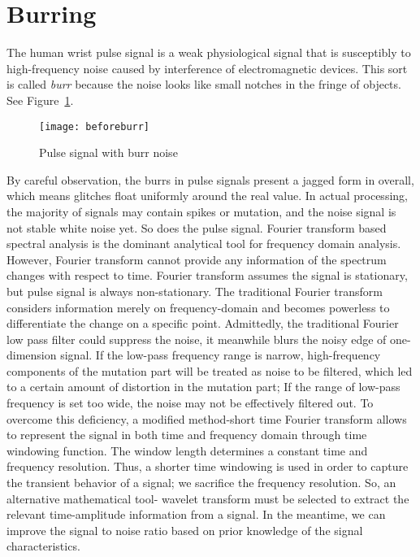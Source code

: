 \section{Burring}
The human wrist pulse signal is a weak physiological signal that
is susceptibly to high-frequency noise caused by interference of
electromagnetic devices. This sort is called \emph{burr} because the
noise looks like small notches in the fringe of objects. See
Figure~\ref{fig:beforeburr}. 
\begin{figure}[htpb]
    \begin{center}
        \texttt{[image: beforeburr]}
    \end{center}
    \caption{Pulse signal with burr noise}
    \label{fig:beforeburr}
\end{figure}
By careful observation, the burrs in pulse signals present a jagged
form in overall, which means glitches float uniformly around the real
value. In actual processing, the majority of signals may contain
spikes or mutation, and the noise signal is not stable white noise yet. 
So does the pulse signal. Fourier transform based spectral analysis is
the dominant analytical tool for frequency 
domain analysis. However, Fourier transform cannot provide any
information of the spectrum changes with respect to time.  Fourier
transform assumes the signal is stationary, but pulse signal is always
non-stationary. The traditional Fourier transform 
considers information merely on frequency-domain and becomes powerless
to differentiate the change on a specific point. Admittedly, the
traditional Fourier low pass filter could suppress the noise, it
meanwhile blurs the noisy edge of one-dimension signal. If the
low-pass frequency range is narrow, high-frequency components of the
mutation part will be treated as noise to be filtered,
which led to a certain amount of distortion in the mutation part; If
the range of low-pass frequency is set too wide, the noise may not be
effectively filtered out. To overcome this deficiency, a modified method-short
time Fourier transform allows to represent the signal in both time and
frequency domain through time windowing function. The window
length determines a constant time and frequency resolution. Thus, a
shorter time windowing is used in order to capture the transient
behavior of a signal; we sacrifice the frequency resolution.
So, an alternative mathematical tool- wavelet
transform must be selected to extract the relevant time-amplitude
information from a signal.  In the meantime, we can improve the signal to noise ratio based on
prior knowledge of the signal characteristics. 

